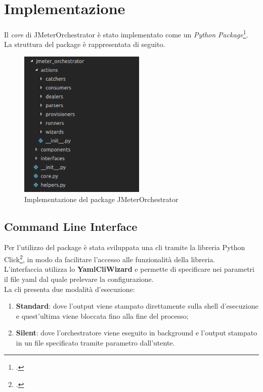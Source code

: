 \section{Implementazione}
Il \textit{core} di JMeterOrchestrator è stato implementato come un \textit{Python Package}\footcite{article:pypackage}. \\
La struttura del package è rappresentata di seguito.
\begin{figure}[H]
	\centering
	\includegraphics[width=6cm]{immagini/implementation}
	\caption{Implementazione del package JMeterOrchestrator}
	\label{img-implementation}
\end{figure}
\subsection{Command Line Interface}
Per l'utilizzo del package è stata sviluppata una \gls{cli} tramite la libreria Python Click\footcite{site:click}, in modo da facilitare l'accesso alle funzionalità della libreria.\\
L'interfaccia utilizza lo \textbf{YamlCliWizard} e permette di specificare nei parametri il file \gls{yaml} dal quale prelevare la configurazione. \\
La \gls{cli} presenta due modalità d'esecuzione:
\begin{enumerate}
	\item \textbf{Standard}: dove l'output viene stampato direttamente sulla \gls{shell} d'esecuzione e quest'ultima viene bloccata fino alla fine del processo;
	\item \textbf{Silent}: dove l'orchestratore viene eseguito in background e l'output stampato in un file specificato tramite parametro dall'utente.
\end{enumerate}
